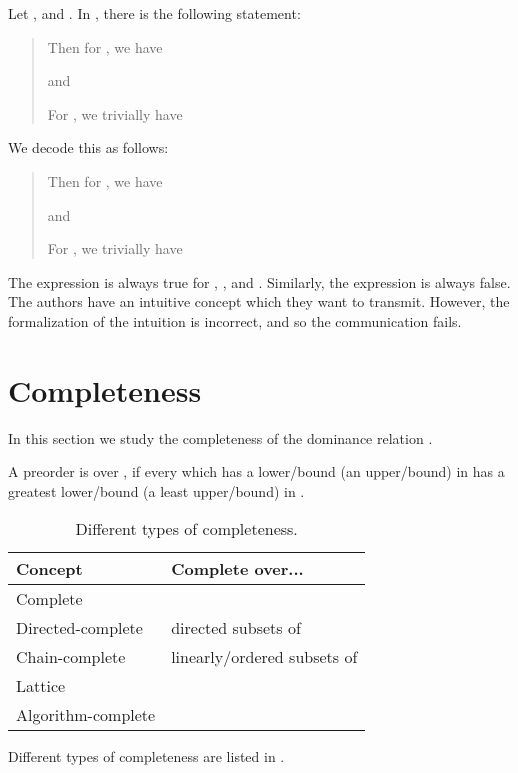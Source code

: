 \documentclass[b5paper, english, oneside]{memoir}
\begin{document}
\begin{example}
Let , and . In \cite[page 9]{ExponentialTrees}, there is the following statement:
\begin{quote}
Then for , we have

and

For , we trivially have

\end{quote}
We decode this as follows:
\begin{quote}
Then for , we have

and

For , we trivially have

\end{quote}
The expression  is always true for , ,  and . Similarly, the expression  is always false. The authors have an intuitive concept which they want to transmit. However, the formalization of the intuition is incorrect, and so the communication fails. 
\end{example}

\section{Completeness}

In this section we study the completeness of the dominance relation .

\begin{definition}
A preorder  is  over , if every  which has a lower\-/bound (an upper\-/bound) in  has a greatest lower\-/bound (a least upper\-/bound) in . 
\end{definition}

\begin{table}
\centering
\begin{tabular}{|l|l|}
\hline
Concept & Complete over... \\
\hline
Complete &  \\
Directed-complete & directed subsets of  \\
Chain-complete & linearly\-/ordered subsets of  \\
Lattice &  \\
Algorithm-complete &  \\
\hline
\end{tabular}
\caption{Different types of completeness.}
\label{DifferentTypesOfCompleteness}
\end{table}

\begin{note}
Different types of completeness are listed in .
\end{note}
\end{document}
